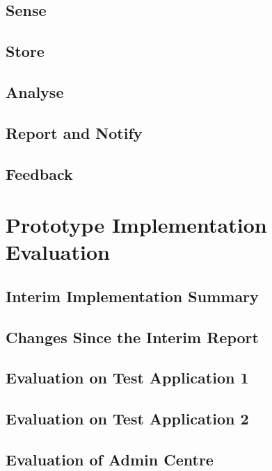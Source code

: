 \documentclass[10pt,a4paper]{article}
\begin{document}
\subsection{Sense}
\label{sec:sense}

\subsection{Store}
\label{sec:store}

\subsection{Analyse}
\label{sec:analyse}

\subsection{Report and Notify}
\label{sec:report}

\subsection{Feedback}
\label{sec:feedback}

\section{Prototype Implementation Evaluation}
\label{sec:prototype}

\subsection{Interim Implementation Summary}
\label{sec:interim_summary}

\subsection{Changes Since the Interim Report}
\label{sec:changes}

\subsection{Evaluation on Test Application 1}
\label{sec:test_app1}

\subsection{Evaluation on Test Application 2}
\label{sec:test_app2}

\subsection{Evaluation of Admin Centre}
\label{sec:admin_centre}
\end{document}

